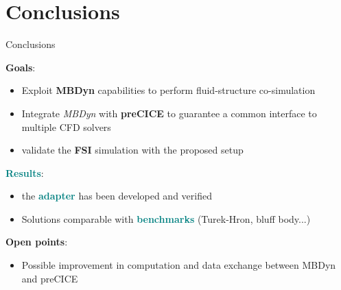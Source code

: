 \documentclass[10pt,t]{beamer}
\begin{document}
\section{Conclusions}

\begin{frame}{Conclusions}


\textcolor{pblue}{\textbf{Goals}}:

\begin{itemize}
    \item Exploit \textcolor{pblue}{\textbf{MBDyn}} capabilities to perform fluid-structure co-simulation
    \item Integrate \textit{MBDyn} with \textcolor{pblue}{\textbf{preCICE}} to guarantee a common interface to multiple CFD solvers
    \item validate the \textcolor{pblue}{\textbf{FSI}} simulation with the proposed setup
\end{itemize}

\pause

\vspace{0.5cm}

\textcolor{teal}{\textbf{Results}}:

\begin{itemize}
    \item the \textcolor{teal}{\textbf{adapter}} has been developed and verified
    \item Solutions comparable with \textcolor{teal}{\textbf{benchmarks}} (Turek-Hron, bluff body...)
\end{itemize}

\pause

\vspace{0.5cm}

\textcolor{dorange}{\textbf{Open points}}:

\begin{itemize}
    \item Possible improvement in computation and data exchange between MBDyn and preCICE 
\end{itemize}



\end{frame}
\end{document}
